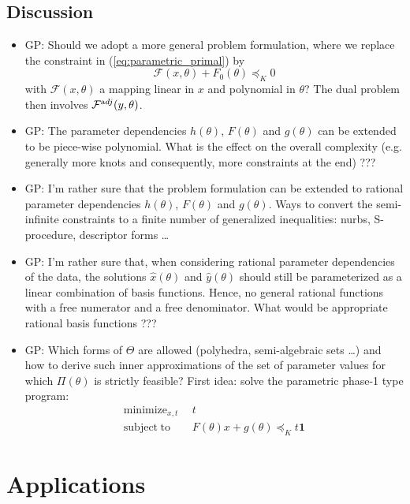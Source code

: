 \documentclass{article}
\DeclareMathOperator*{\minimize}{minimize}
\DeclareMathOperator*{\subj}{subject\;to}
\begin{document}
\subsection{Discussion}
\begin{itemize}
\item GP: Should we adopt a more general problem formulation, where we replace the constraint in (\ref{eq:parametric_primal}) by
    \[ \mathcal{F}(x,\theta) + F_0(\theta) \preceq_K 0
    \]
    with $\mathcal{F}(x,\theta)$ a mapping linear in $x$ and polynomial in $\theta$? The dual problem then involves $\mathcal{F}^{\text adj}(y,\theta)$.
\item GP: The parameter dependencies $h(\theta)$, $F(\theta)$ and $g(\theta)$ can be extended to be piece-wise polynomial. What is the effect on the overall complexity (e.g. generally more knots and consequently, more constraints at the end) ???
\item GP: I'm rather sure that the problem formulation can be extended to rational parameter dependencies $h(\theta)$, $F(\theta)$ and $g(\theta)$. Ways to convert the semi-infinite constraints to a finite number of generalized inequalities: nurbs, S-procedure, descriptor forms \ldots
\item GP: I'm rather sure that, when considering rational parameter dependencies of the data, the solutions $\hat{x}(\theta)$ and $\hat{y}(\theta)$ should still be parameterized as a linear combination of basis functions. Hence, no general rational functions with a free numerator and a free denominator. What would be appropriate rational basis functions ???
\item GP: Which forms of $\Theta$ are allowed (polyhedra, semi-algebraic sets \ldots) and how to derive such inner approximations of the set of parameter values for which $\Pi(\theta)$ is strictly feasible? First idea: solve the parametric phase-1 type program:
    \begin{align*}
    \minimize_{x,t} &~~ t\\
    \subj           &~~ F(\theta)x+g(\theta)\preceq_K t \bm{1}
    \end{align*}
\end{itemize}



\section{Applications}
\end{document}
